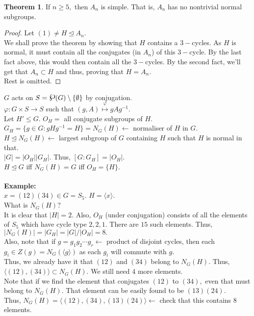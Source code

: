 \documentclass[12 pt, a4paper, toc=graduated, oneside]{article}
\theoremstyle{definition}
\newtheorem{theorem}{Theorem}
\newcommand{\pset}{\raisebox{.15\baselineskip}{{\Large\ensuremath{\wp}}}}
\begin{document}
\begin{theorem}
	If $n \ge 5,$ then $A_n$ is simple. That is, $A_n$ has no nontrivial normal subgroups.
\end{theorem}
\begin{proof}
	Let $(1) \neq H \trianglelefteq A_n.$ \\
	We shall prove the theorem by showing that $H$ contains a $3-$cycles. As $H$ is normal, it must contain all the conjugates (in $A_n$) of this $3-$cycle. By the last fact above, this would then contain all the $3-$cycles. By the second fact, we'll get that $A_n \subset H$ and thus, proving that $H = A_n.$\\
	Rest is omitted.
\end{proof}
$G$ acts on $ S = \pset (G) \setminus \{\emptyset\}$ by conjugation.\\
$\varphi : G\times S \to S$ such that $(g, A) \overset{\varphi}{\mapsto}gAg^{-1}.$\\
Let $H' \le G.$ $O_H = $ all conjugate subgroups of $H.$\\
$G_H = \{g \in G:gHg^{-1} = H\} = N_G(H)  \longleftarrow$ normaliser of $H$ in $G.$\\
$H \trianglelefteq N_G(H) \longleftarrow$ largest subgroup of $G$ containing $H$ such that $H$ is normal in that.\\
$|G| = |O_H||G_H|.$ Thus, $[G:G_H] = |O_H|.$\\
$H\trianglelefteq G$ iff $N_G(H) = G$ iff $O_H = \{H\}.$\\~\\
\textbf{Example:}\\
$x = (12)(34) \in G = S_5.$ $H = \langle x\rangle.$\\
What is $N_G(H)?$\\
It is clear that $|H| = 2.$ Also, $O_H$ (under conjugation) consists of all the elements of $S_5$ which have cycle type $2, 2, 1.$ There are $15$ such elements. Thus, $|N_G(H)| = |G_H| = |G|/|O_H| = 8.$\\
Also, note that if $g = g_1g_2\cdots g_r \longleftarrow$ product of disjoint cycles, then each $g_i \in Z(g) = N_G(\langle g\rangle)$ as each $g_i$ will commute with $g.$\\
Thus, we already have it that $(12)$ and $(34)$ belong to $N_G(H).$ Thus, $\langle (12), (34)\rangle \subset N_G(H).$ We still need $4$ more elements.\\
Note that if we find the element that conjugates $(12)$ to $(34),$ even that must belong to $N_G(H).$ That element can be easily found to be $(13)(24).$\\
Thus, $N_G(H) = \langle (12), (34), (13)(24)\rangle \longleftarrow$ check that this contains $8$ elements.
\end{document}
